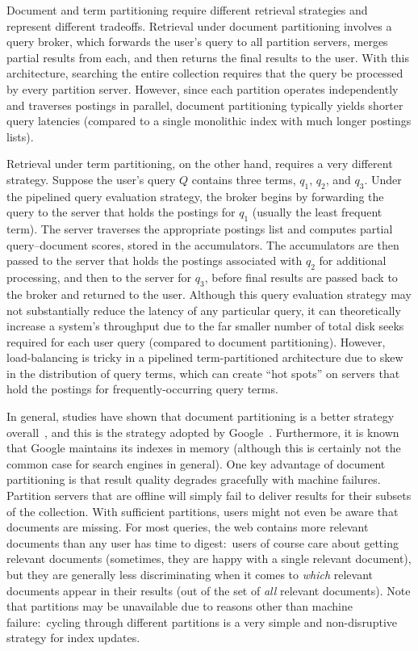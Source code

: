 Document and term partitioning require different retrieval strategies
and represent different tradeoffs.  Retrieval under document
partitioning involves a query broker, which forwards the user's query
to all partition servers, merges partial results from each, and then
returns the final results to the user.  With this architecture,
searching the entire collection requires that the query be processed
by every partition server.  However, since each partition operates
independently and traverses postings in parallel, document
partitioning typically yields shorter query latencies (compared to a
single monolithic index with much longer postings lists).  

Retrieval under term partitioning, on the other hand, requires a very
different strategy.  Suppose the user's query $Q$ contains three
terms, $q_1$, $q_2$, and $q_3$.  Under the pipelined query evaluation
strategy, the broker begins by forwarding the query to the server that
holds the postings for $q_1$ (usually the least frequent term).  The
server traverses the appropriate postings list and computes partial
query--document scores, stored in the accumulators.  The accumulators
are then passed to the server that holds the postings associated with
$q_2$ for additional processing, and then to the server for $q_3$,
before final results are passed back to the broker and returned to the
user.  Although this query evaluation strategy may not substantially
reduce the latency of any particular query, it can theoretically
increase a system's throughput due to the far smaller number of total
disk seeks required for each user query (compared to document
partitioning).  However, load-balancing is tricky in a pipelined
term-partitioned architecture due to skew in the distribution of query
terms, which can create ``hot spots'' on servers that hold the
postings for frequently-occurring query terms.

In general, studies have shown that document partitioning is a better
strategy overall~\cite{Moffat_etal_SIGIR2006}, and this is the
strategy adopted by Google~\cite{Barroso03}.  Furthermore, it is known
that Google maintains its indexes in memory (although this is
certainly not the common case for search engines in general).  One key
advantage of document partitioning is that result quality degrades
gracefully with machine failures.  Partition servers that are offline
will simply fail to deliver results for their subsets of the
collection.  With sufficient partitions, users might not even be aware
that documents are missing.  For most queries, the web contains
more relevant documents than any user has time to digest:\ users of
course care about getting relevant documents (sometimes, they are
happy with a single relevant document), but they are generally less
discriminating when it comes to \emph{which} relevant documents appear
in their results (out of the set of \emph{all} relevant documents).
Note that partitions may be unavailable due to reasons other than
machine failure:\ cycling through different partitions is a very
simple and non-disruptive strategy for index updates.


